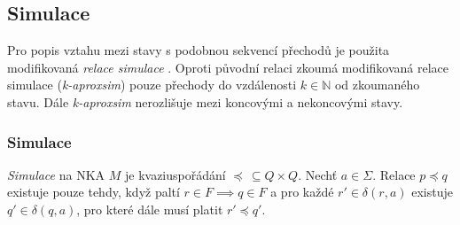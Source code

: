


    \subsection{Simulace}
        Pro popis vztahu mezi stavy s podobnou sekvencí přechodů je použita modifikovaná \textit{relace simulace} \cite{Computing_simulaitons, When_simulation_meets_antichains}. Oproti původní relaci zkoumá modifikovaná relace simulace (\textit{k-aproxsim}) pouze přechody do vzdálenosti $k \in \mathbb{N}$ od zkoumaného stavu. Dále \textit{k-aproxsim} nerozlišuje mezi koncovými a nekoncovými stavy.

        \subsubsection*{Simulace}
            \textit{Simulace} na NKA $M$ je kvaziuspořádání $\preceq\, \subseteq Q \times Q$. Nechť $a \in \Sigma$. Relace $p \preceq q$ existuje pouze tehdy, když paltí $r \in F \implies q \in F$ a pro každé $r' \in \delta(r, a)$ existuje $q' \in \delta(q, a)$, pro které dále musí platit $r' \preceq q'$.

